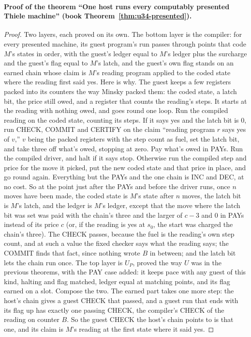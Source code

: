 \documentclass[11pt,twoside]{article}
\theoremstyle{thielethm}
\theoremstyle{thieledef}
\theoremstyle{thieledef}
\theoremstyle{thieledef}
\theoremstyle{thielethm}
\theoremstyle{thieleobs}
\theoremstyle{thielethm}
\begin{document}
\paragraph{Proof of the theorem ``One host runs every computably presented Thiele machine'' (book Theorem~\ref{thm:u34-presented}).}
\begin{proof}
Two layers, each proved on its own. The bottom layer is the compiler: for every presented
machine, its guest program's run passes through points that code $M$'s states in order, with the
guest's ledger equal to $M$'s ledger plus the surcharge and the guest's flag equal to $M$'s latch,
and the guest's own flag stands on an earned chain whose claim is $M$'s reading program applied to
the coded state where the reading first said yes. Here is why. The guest keeps a few registers
packed into its counters the way Minsky packed them: the coded state, a latch bit, the price
still owed, and a register that counts the reading's steps. It starts at the reading with
nothing owed, and goes round one loop. Run the compiled reading on the coded state, counting its
steps. If it says yes and the latch bit is 0, run CHECK, COMMIT and CERTIFY on the claim
``reading program $r$ says yes of $v$,'' $v$ being the packed registers with the step count as
fuel, set the latch bit, and take three off what's owed, stopping at zero. Pay what's owed in
PAYs. Run the compiled driver, and halt if it says stop. Otherwise run the compiled step and
price for the move it picked, put the new coded state and that price in place, and go round
again. Everything but the PAYs and the one chain is INC and DEC, at no cost. So at the point just
after the PAYs and before the driver runs, once $n$ moves have been made, the coded state is $M$'s state after $n$ moves, the latch bit is $M$'s
latch, and the ledger is $M$'s ledger, except that the move where the latch bit was set was paid
with the chain's three and the larger of $c - 3$ and 0 in PAYs instead of its price $c$ (or, if the reading is yes at $s_0$, the start was charged the chain's three). The
CHECK passes, because the fuel is the reading's own step count, and at such a value the fixed
checker says what the reading says; the COMMIT finds that fact, since nothing wrote $B$ in
between; and the latch bit lets the chain run once. The top layer is $U_P$, proved the way $U$ was
in the previous theorems, with the PAY case added: it keeps pace with any guest of this kind,
halting and flag matched, ledger equal at matching points, and its flag earned on a slot. Compose
the two. The earned part takes one more step: the host's chain gives a guest CHECK that passed, and
a guest run that ends with its flag up has exactly one passing CHECK, the compiler's CHECK of the
reading on counter $B$. So the guest CHECK the host's chain points to is that one, and its claim is $M$'s
reading at the first state where it said yes.
\end{proof}
\end{document}
